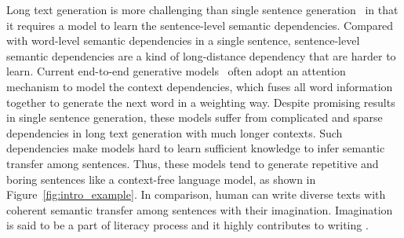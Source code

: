 \documentclass[letterpaper]{article} %
\begin{document}
Long text generation is more challenging than single sentence generation~\cite{langkilde-et-al:sentece_generation} in that it requires a model to learn the sentence-level semantic dependencies. Compared with word-level semantic dependencies in a single sentence,
sentence-level semantic dependencies are a kind of long-distance dependency that are harder to learn. 
Current end-to-end generative models~\citep{sutskever-et-al:seq2seq,vaswani-et-al:transformer} often adopt an attention mechanism to model the context dependencies, which fuses all word information together to generate the next word in a weighting way. 
Despite promising results in single sentence generation, these models suffer from complicated and sparse dependencies in long text generation with much longer contexts. Such dependencies make models hard to learn sufficient knowledge to infer semantic transfer among sentences.  Thus, these models tend to generate repetitive and boring sentences like a context-free language model, as shown in Figure~\ref{fig:intro_example}. In comparison, human can write diverse texts with coherent semantic transfer among sentences with their imagination. %
Imagination is said to be a part of literacy process and it highly contributes to writing \citep{colello:colello2007imagination}.
\end{document}
